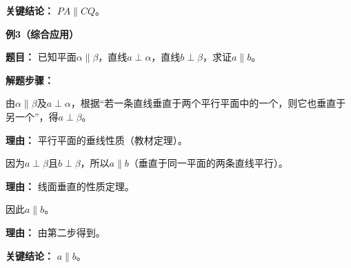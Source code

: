 \begin{examplebox}
	\textbf{\textcolor{CExample}{关键结论：}}
	\textbf{$PA\parallel CQ$}。

	\medskip
	\textbf{\textcolor{CExample}{例3（综合应用）}}

	\textbf{\textcolor{CExample}{题目：}}
	已知平面$\alpha\parallel\beta$，直线$a\perp\alpha$，直线$b\perp\beta$，求证$a\parallel b$。

	\textbf{\textcolor{CExample}{解题步骤：}}
	\begin{description}[style=nextline, leftmargin=2.8em, labelsep=0.5em, itemsep=0.45em]
		\item[\textbf{第一步（平行平面性质）：}] 由$\alpha\parallel\beta$及$a\perp\alpha$，根据“若一条直线垂直于两个平行平面中的一个，则它也垂直于另一个”，得$a\perp\beta$。
			\par\textbf{理由：}
			平行平面的垂线性质（教材定理）。

		\item[\textbf{第二步（再次应用定理）：}] 因为$a\perp\beta$且$b\perp\beta$，所以$a\parallel b$（垂直于同一平面的两条直线平行）。
			\par\textbf{理由：}
			线面垂直的性质定理。

		\item[\textbf{第三步（结论完成）：}] 因此$a\parallel b$。
			\par\textbf{理由：}
			由第二步得到。
	\end{description}

	\textbf{\textcolor{CExample}{关键结论：}}
	\textbf{$a\parallel b$}。
\end{examplebox}
